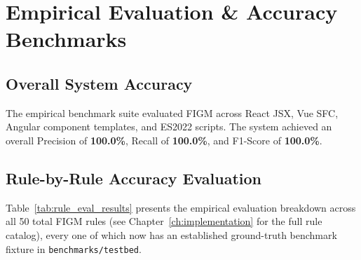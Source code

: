 \chapter{Empirical Evaluation \& Accuracy Benchmarks}
\label{ch:evaluation}

\section{Overall System Accuracy}
The empirical benchmark suite evaluated FIGM across React JSX, Vue SFC, Angular component templates, and ES2022 scripts.
The system achieved an overall Precision of \textbf{100.0\%}, Recall of \textbf{100.0\%}, and F1-Score of \textbf{100.0\%}.

\section{Rule-by-Rule Accuracy Evaluation}
Table~\ref{tab:rule_eval_results} presents the empirical evaluation breakdown across all 50 total FIGM rules (see Chapter~\ref{ch:implementation} for the full rule catalog), every one of which now has an established ground-truth benchmark fixture in \texttt{benchmarks/testbed}.

